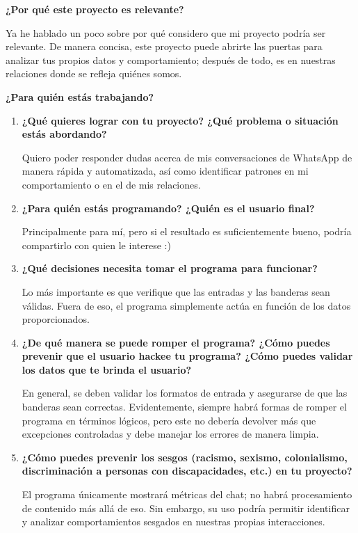 \textbf{¿Por qué este proyecto es relevante?}\vspace{.3cm}

Ya he hablado un poco sobre por qué considero que mi proyecto podría ser relevante. De manera concisa, este proyecto puede abrirte las puertas para analizar tus propios datos y comportamiento; después de todo, es en nuestras relaciones donde se refleja quiénes somos. \vspace{.3cm}

\textbf{¿Para quién estás trabajando?}\vspace{.3cm}

\begin{enumerate}
    \item \textbf{¿Qué quieres lograr con tu proyecto? ¿Qué problema o situación estás abordando?}
    
    Quiero poder responder dudas acerca de mis conversaciones de WhatsApp de manera rápida y automatizada, así como identificar patrones en mi comportamiento o en el de mis relaciones.

    \item \textbf{¿Para quién estás programando? ¿Quién es el usuario final?} 
    
    Principalmente para mí, pero si el resultado es suficientemente bueno, podría compartirlo con quien le interese :)

    \item \textbf{¿Qué decisiones necesita tomar el programa para funcionar?}
    
    Lo más importante es que verifique que las entradas y las banderas sean válidas. Fuera de eso, el programa simplemente actúa en función de los datos proporcionados.

    \item \textbf{¿De qué manera se puede romper el programa? ¿Cómo puedes prevenir que el usuario hackee tu programa? ¿Cómo puedes validar los datos que te brinda el usuario?}
    
    En general, se deben validar los formatos de entrada y asegurarse de que las banderas sean correctas. Evidentemente, siempre habrá formas de romper el programa en términos lógicos, pero este no debería devolver más que excepciones controladas y debe manejar los errores de manera limpia.

    \item \textbf{¿Cómo puedes prevenir los sesgos (racismo, sexismo, colonialismo, discriminación a personas con discapacidades, etc.) en tu proyecto?}
    
    El programa únicamente mostrará métricas del chat; no habrá procesamiento de contenido más allá de eso. Sin embargo, su uso podría permitir identificar y analizar comportamientos sesgados en nuestras propias interacciones.
\end{enumerate}

